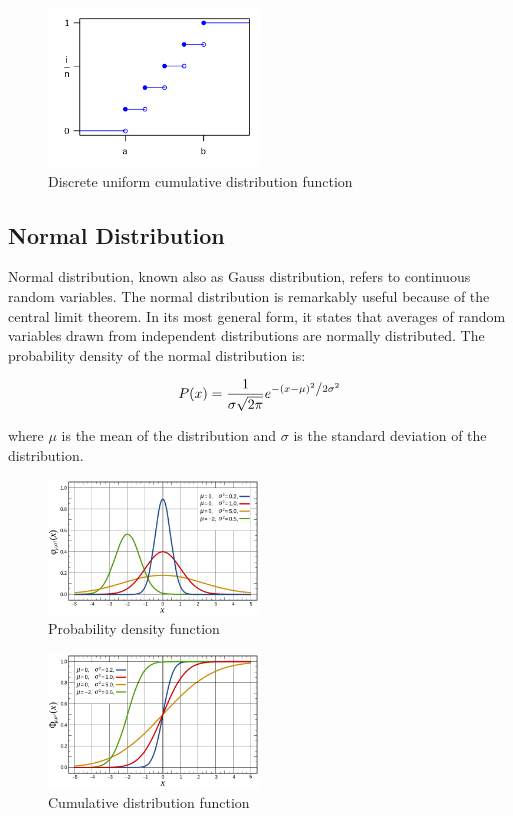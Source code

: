 \begin{figure}[H]
  \centering
  \includegraphics[width=0.5\textwidth]{figures/uniform_2.png}
  \caption{Discrete uniform cumulative distribution function \cite{20}}
\end{figure}

\subsection{Normal Distribution}

Normal distribution, known also as Gauss distribution, refers to continuous random variables. 
The normal distribution is remarkably useful because of the central limit theorem. In its most general form, it states that averages of random variables 
drawn from independent distributions are normally distributed. The probability density of the normal distribution is:

\[P(x) = \frac{1}{{\sigma \sqrt {2\pi } }}e^{{{ - \left( {x - \mu } \right)^2 } \mathord{\left/ {\vphantom {{ - \left( {x - \mu } \right)^2 } {2\sigma ^2 }}} \right. \kern-\nulldelimiterspace} {2\sigma ^2 }}}\]

where \(\mu\) is the mean of the distribution and \(\sigma\) is the standard deviation of the distribution.

\begin{figure}[H]
  \centering
  \includegraphics[width=0.5\textwidth]{figures/gauss_1.png}
  \caption{Probability density function \cite{21}}
\end{figure}

\begin{figure}[H]
  \centering
  \includegraphics[width=0.5\textwidth]{figures/gauss_2.png}
  \caption{Cumulative distribution function \cite{22}}
\end{figure}

